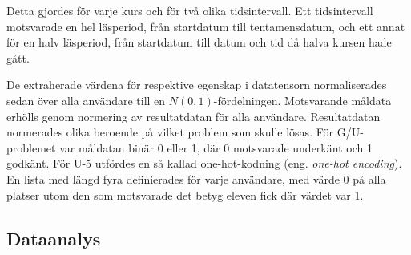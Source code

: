 



Detta gjordes för varje kurs och för två olika tidsintervall. Ett tidsintervall motsvarade en hel läsperiod, från startdatum till tentamensdatum, och ett annat för en halv läsperiod, från startdatum till datum och tid då halva kursen hade gått. 

De extraherade värdena för respektive egenskap i datatensorn normaliserades sedan över alla användare till en $N(0,1)$-fördelningen. Motsvarande måldata erhölls genom normering av resultatdatan för alla användare. Resultatdatan normerades olika beroende på vilket problem som skulle lösas. För G/U-problemet var måldatan binär 0 eller 1, där 0 motsvarade underkänt och 1 godkänt. För U-5 utfördes en så kallad one-hot-kodning (eng. \emph{one-hot encoding}). En lista med längd fyra definierades för varje användare, med värde 0 på alla platser utom den som motsvarade det betyg eleven fick där värdet var 1.

 
\subsection{Dataanalys}

